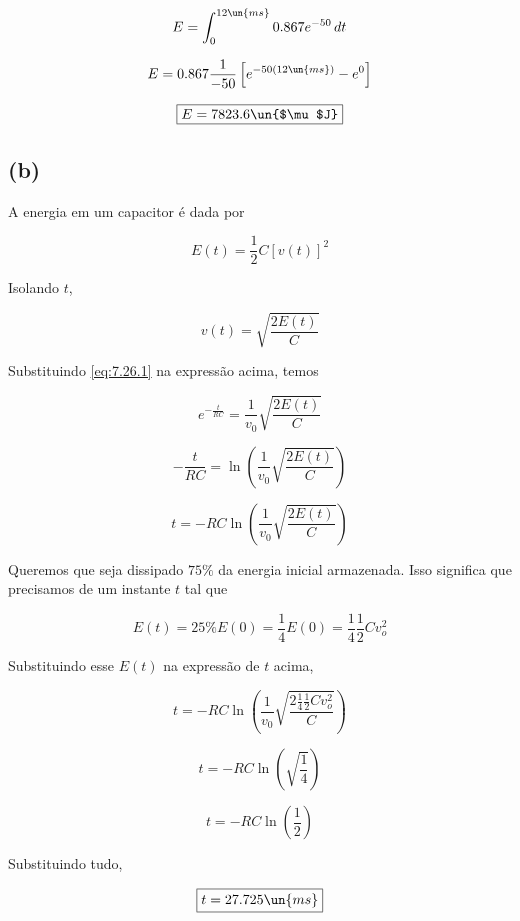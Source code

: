 \[ E = \int_{0}^{12 \un{ms}} 0.867e^{-50} \,dt \]

\[ E = 0.867 \frac{1}{-50} \left[e^{-50(12 \un{ms})} - e^{0}\right] \]

\[ \boxed{E = 7823.6 \un{$\mu$J}}  \]

\subsection*{(b)}

A energia em um capacitor é dada por  

\begin{equation}\label{eq:7.26.2}
    E(t) = \frac{1}{2}C[v(t)]^2
\end{equation}

Isolando $t$, 

\[ v(t) = \sqrt{\frac{2E(t)}{C}}  \]

Substituindo \eqref{eq:7.26.1} na expressão acima, temos   

\[ e^{-\frac{t}{RC}} = \frac{1}{v_0} \sqrt{\frac{2E(t)}{C}}  \]

\[ -\frac{t}{RC} = \ln \left(\frac{1}{v_0} \sqrt{\frac{2E(t)}{C}}\right)   \]

\[ t = -RC\ln \left(\frac{1}{v_0} \sqrt{\frac{2E(t)}{C}}\right)   \]

Queremos que seja dissipado $75\%$ da energia inicial armazenada. Isso significa que precisamos de um instante $t$ tal que

\[ E(t) = 25\% E(0) = \frac{1}{4}E(0) = \frac{1}{4}\frac{1}{2}Cv_o^2 \]

Substituindo esse $E(t)$ na expressão de $t$ acima,   

\[ t = -RC\ln \left(\frac{1}{v_0} \sqrt{\frac{2\frac{1}{4}\frac{1}{2}Cv_o^2}{C}}\right)  \]

\[ t = -RC\ln \left(\sqrt{\frac{1}{4}}\right)  \]

\[ t = -RC\ln \left(\frac{1}{2}\right)  \]

Substituindo tudo,   

\[ \boxed{t = 27.725 \un{ms}}  \]

















